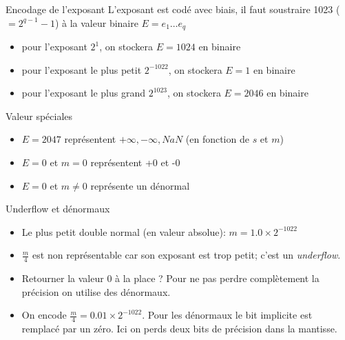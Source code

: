 \documentclass{beamer}
\begin{document}
\begin{frame}{Encodage de l'exposant}
    L'exposant est codé avec biais, il faut soustraire 1023 ($ = 2^{q-1}-1$) à la valeur binaire $E=e_1\ldots e_q$
    \begin{itemize}
        \item pour l'exposant $2^1$, on stockera $E = 1024$ en binaire
        \item pour l'exposant le plus petit $2^{-1022}$, on stockera $E = 1$ en binaire
        \item pour l'exposant le plus grand $2^{1023}$, on stockera $E = 2046$ en binaire
    \end{itemize}

    \begin{block}{Valeur spéciales}
        \begin{itemize}
            \item $E = 2047$ représentent $+\infty, -\infty, NaN$ (en fonction de $s$ et $m$)
            \item $E = 0$ et $m = 0$ représentent +0 et -0
            \item $E = 0$ et $m \neq 0$ représente un dénormal
        \end{itemize}
    \end{block}
\end{frame}

\begin{frame}{Underflow et dénormaux}

    \begin{itemize}
        \item Le plus petit double normal (en valeur absolue): $ m = 1.0 \times 2^{-1022} $
        \item $\frac{m}{4}$ est non représentable car son exposant est trop petit; c'est un \emph{underflow}.
        \item Retourner la valeur $0$ à la place ? Pour ne pas
              perdre complètement la précision on utilise des dénormaux.
        \item On encode $ \frac{m}{4} = 0.01 \times 2^{-1022} $. Pour les dénormaux le bit implicite est remplacé par un zéro. Ici on perds deux bits de précision dans la mantisse.
    \end{itemize}
\end{frame}
\end{document}
